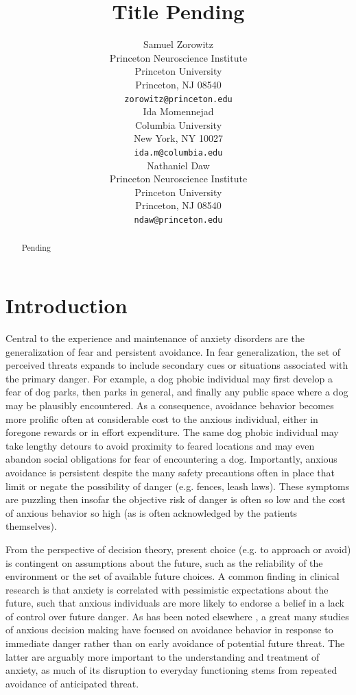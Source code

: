 \documentclass[11pt]{article} %
\title{Title Pending}
\author{
Samuel Zorowitz \\
Princeton Neuroscience Institute\\
Princeton University\\
Princeton, NJ 08540 \\
\texttt{zorowitz@princeton.edu} \\
\And
Ida Momennejad \\
Columbia University\\
New York, NY 10027 \\
\texttt{ida.m@columbia.edu} \\
\And
Nathaniel Daw \\
Princeton Neuroscience Institute\\
Princeton University\\
Princeton, NJ 08540 \\
\texttt{ndaw@princeton.edu} \\
}
\begin{document}
\maketitle

\begin{abstract}
Pending
\end{abstract}


\startmain

\section{Introduction}

Central to the experience and maintenance of anxiety disorders are the generalization of fear and persistent avoidance. In fear generalization, the set of perceived threats expands to include secondary cues or situations associated with the primary danger. For example, a dog phobic individual may first develop a fear of dog parks, then parks in general, and finally any public space where a dog may be plausibly encountered. As a consequence, avoidance behavior becomes more prolific often at considerable cost to the anxious individual, either in foregone rewards or in effort expenditure. The same dog phobic individual may take lengthy detours to avoid proximity to feared locations and may even abandon social obligations for fear of encountering a dog. Importantly, anxious avoidance is persistent despite the many safety precautions often in place that limit or negate the possibility of danger (e.g. fences, leash laws). These symptoms are puzzling then insofar the objective risk of danger is often so low and the cost of anxious behavior so high (as is often acknowledged by the patients themselves).

From the perspective of decision theory, present choice (e.g. to approach or avoid) is contingent on assumptions about the future, such as the reliability of the environment or the set of available future choices. A common finding in clinical research is that anxiety is correlated with pessimistic expectations about the future, such that anxious individuals are more likely to endorse a belief in a lack of control over future danger. As has been noted elsewhere \cite{Krypotos2015}, a great many studies of anxious decision making have focused on avoidance behavior in response to immediate danger rather than on early avoidance of potential future threat. The latter are arguably more important to the understanding and treatment of anxiety, as much of its disruption to everyday functioning stems from repeated avoidance of anticipated threat.
\end{document}
